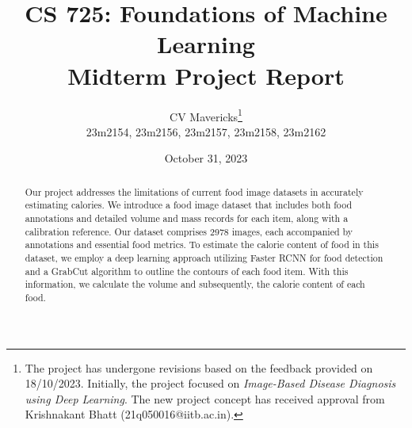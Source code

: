 \documentclass[12pt, a4paper, twoside]{article}
\title{\vspace{-0.5in}\textbf{CS 725: Foundations of Machine Learning \\
Midterm Project Report}}
\author{CV Mavericks\footnote{The project has undergone revisions based on the feedback provided on 18/10/2023. Initially, the project focused on \emph{Image-Based Disease Diagnosis using Deep Learning}. The new project concept has received approval from Krishnakant Bhatt (21q050016@iitb.ac.in).}\\
23m2154, 23m2156, 23m2157, 23m2158, 23m2162}
\date{October 31, 2023}
\begin{document}
\maketitle
\thispagestyle{fancy}

\begin{abstract}
Our project addresses the limitations of current food image datasets in accurately estimating calories. We introduce a food image dataset that includes both food annotations and detailed volume and mass records for each item, along with a calibration reference. Our dataset comprises 2978 images, each accompanied by annotations and essential food metrics. To estimate the calorie content of food in this dataset, we employ a deep learning approach utilizing Faster RCNN for food detection and a GrabCut algorithm to outline the contours of each food item. With this information, we calculate the volume and subsequently, the calorie content of each food.
\end{abstract}
\end{document}
